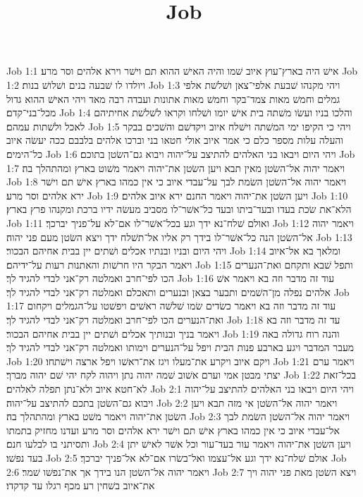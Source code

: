 

\title{Job}

Job 1:1  אישׁ היה בארץ־עוץ איוב שׁמו והיה האישׁ ההוא תם וישׁר וירא אלהים וסר מרע׃
Job 1:2  ויולדו לו שׁבעה בנים ושׁלושׁ בנות׃
Job 1:3  ויהי מקנהו שׁבעת אלפי־צאן ושׁלשׁת אלפי גמלים וחמשׁ מאות צמד־בקר וחמשׁ מאות אתונות ועבדה רבה מאד ויהי האישׁ ההוא גדול מכל־בני־קדם׃
Job 1:4  והלכו בניו ועשׂו משׁתה בית אישׁ יומו ושׁלחו וקראו לשׁלשׁת אחיתיהם לאכל ולשׁתות עמהם׃
Job 1:5  ויהי כי הקיפו ימי המשׁתה וישׁלח איוב ויקדשׁם והשׁכים בבקר והעלה עלות מספר כלם כי אמר איוב אולי חטאו בני וברכו אלהים בלבבם ככה יעשׂה איוב כל־הימים׃
Job 1:6  ויהי היום ויבאו בני האלהים להתיצב על־יהוה ויבוא גם־השׂטן בתוכם׃
Job 1:7  ויאמר יהוה אל־השׂטן מאין תבא ויען השׂטן את־יהוה ויאמר משׁוט בארץ ומהתהלך בה׃
Job 1:8  ויאמר יהוה אל־השׂטן השׂמת לבך על־עבדי איוב כי אין כמהו בארץ אישׁ תם וישׁר ירא אלהים וסר מרע׃
Job 1:9  ויען השׂטן את־יהוה ויאמר החנם ירא איוב אלהים׃
Job 1:10  הלא־את שׂכת בעדו ובעד־ביתו ובעד כל־אשׁר־לו מסביב מעשׂה ידיו ברכת ומקנהו פרץ בארץ׃
Job 1:11  ואולם שׁלח־נא ידך וגע בכל־אשׁר־לו אם־לא על־פניך יברכך׃
Job 1:12  ויאמר יהוה אל־השׂטן הנה כל־אשׁר־לו בידך רק אליו אל־תשׁלח ידך ויצא השׂטן מעם פני יהוה׃
Job 1:13  ויהי היום ובניו ובנתיו אכלים ושׁתים יין בבית אחיהם הבכור׃
Job 1:14  ומלאך בא אל־איוב ויאמר הבקר היו חרשׁות והאתנות רעות על־ידיהם׃
Job 1:15  ותפל שׁבא ותקחם ואת־הנערים הכו לפי־חרב ואמלטה רק־אני לבדי להגיד לך׃
Job 1:16  עוד זה מדבר וזה בא ויאמר אשׁ אלהים נפלה מן־השׁמים ותבער בצאן ובנערים ותאכלם ואמלטה רק־אני לבדי להגיד לך׃
Job 1:17  עוד זה מדבר וזה בא ויאמר כשׂדים שׂמו שׁלשׁה ראשׁים ויפשׁטו על־הגמלים ויקחום ואת־הנערים הכו לפי־חרב ואמלטה רק־אני לבדי להגיד לך׃
Job 1:18  עד זה מדבר וזה בא ויאמר בניך ובנותיך אכלים ושׁתים יין בבית אחיהם הבכור׃
Job 1:19  והנה רוח גדולה באה מעבר המדבר ויגע בארבע פנות הבית ויפל על־הנערים וימותו ואמלטה רק־אני לבדי להגיד לך׃
Job 1:20  ויקם איוב ויקרע את־מעלו ויגז את־ראשׁו ויפל ארצה וישׁתחו׃
Job 1:21  ויאמר ערם יצתי מבטן אמי וערם אשׁוב שׁמה יהוה נתן ויהוה לקח יהי שׁם יהוה מברך׃
Job 1:22  בכל־זאת לא־חטא איוב ולא־נתן תפלה לאלהים׃
Job 2:1  ויהי היום ויבאו בני האלהים להתיצב על־יהוה ויבוא גם־השׂטן בתכם להתיצב על־יהוה׃
Job 2:2  ויאמר יהוה אל־השׂטן אי מזה תבא ויען השׂטן את־יהוה ויאמר משׁט בארץ ומהתהלך בה׃
Job 2:3  ויאמר יהוה אל־השׂטן השׂמת לבך אל־עבדי איוב כי אין כמהו בארץ אישׁ תם וישׁר ירא אלהים וסר מרע ועדנו מחזיק בתמתו ותסיתני בו לבלעו חנם׃
Job 2:4  ויען השׂטן את־יהוה ויאמר עור בעד־עור וכל אשׁר לאישׁ יתן בעד נפשׁו׃
Job 2:5  אולם שׁלח־נא ידך וגע אל־עצמו ואל־בשׂרו אם־לא אל־פניך יברכך׃
Job 2:6  ויאמר יהוה אל־השׂטן הנו בידך אך את־נפשׁו שׁמר׃
Job 2:7  ויצא השׂטן מאת פני יהוה ויך את־איוב בשׁחין רע מכף רגלו עד קדקדו׃
